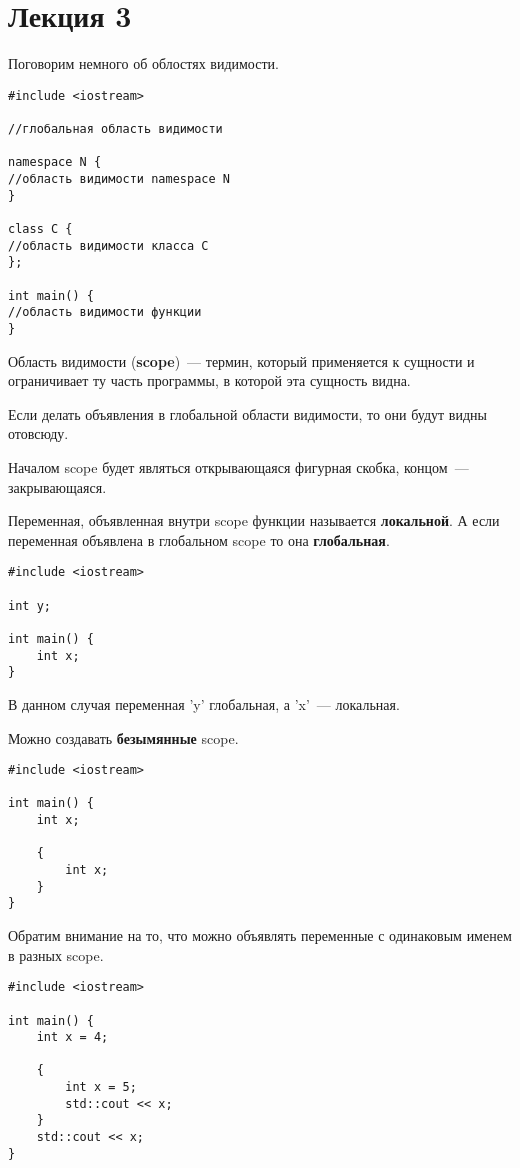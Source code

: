 \section*{Лекция 3}

Поговорим немного об облостях видимости.

\begin{verbatim}
#include <iostream>

//глобальная область видимости

namespace N {
//область видимости namespace N
}

class C {
//область видимости класса C
};

int main() {
//область видимости функции
}
\end{verbatim}

Область видимости (\textbf{scope})~--- термин, который применяется к сущности 
и ограничивает ту часть программы, в которой эта сущность видна.

Если делать объявления в глобальной области видимости, то они будут видны отовсюду.

Началом scope будет являться открывающаяся фигурная скобка, концом~--- закрывающаяся.

Переменная, объявленная внутри scope функции называется \textbf{локальной}.
А если переменная объявлена в глобальном scope то она \textbf{глобальная}.

\begin{verbatim}
#include <iostream>

int y;

int main() {
    int x;
}
\end{verbatim}

В данном случая переменная 'y' глобальная, а 'x'~--- локальная.

Можно создавать \textbf{безымянные} scope.

\begin{verbatim}
#include <iostream>

int main() {
    int x;

    {
        int x;
    }
}
\end{verbatim}

Обратим внимание на то, что можно объявлять переменные с одинаковым именем в разных scope.

\begin{verbatim}
#include <iostream>

int main() {
    int x = 4;

    {
        int x = 5;
        std::cout << x;
    }
    std::cout << x;
}
\end{verbatim}

